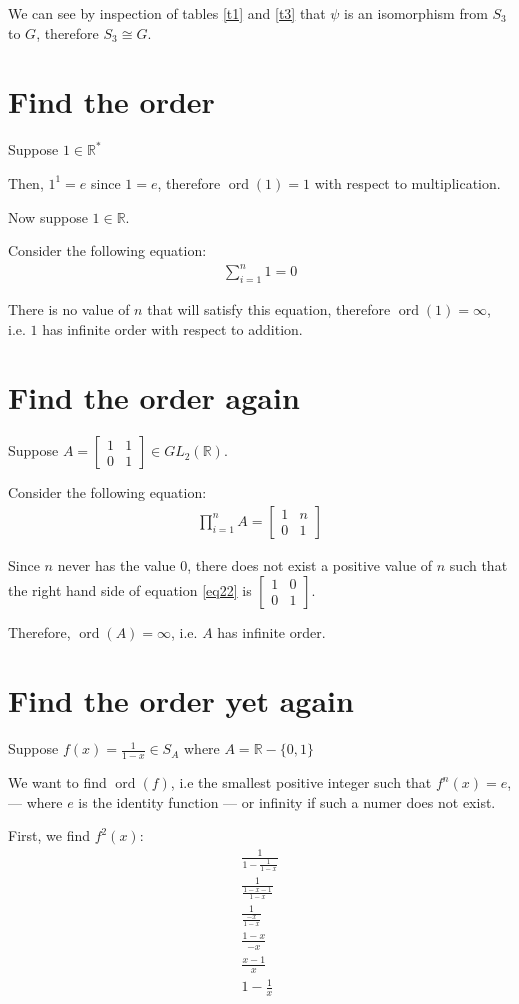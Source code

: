 \documentclass[12pt]{article}
\newcommand{\reals}{\mathbb{R}}
\newcommand{\gltwo}{GL_2(\reals)}
\newcommand{\glmatrix}[4]{\ensuremath{\begin{bmatrix} #1 & #2 \\ #3 & #4 \end{bmatrix}}}
\newcommand{\ord}{\operatorname{ord}}
\begin{document}
We can see by inspection of tables \ref{t1} and \ref{t3}
that $\psi$ is an isomorphism from $S_3$ to $G$,
therefore $S_3 \cong G$.

\section{Find the order}

Suppose $1 \in \reals^*$

Then, $1^1 = e$ since $1 = e$, therefore $\ord(1) = 1$ with respect to multiplication.

Now suppose $1 \in \reals$.

Consider the following equation:
\begin{align} \label{eq21}
	\sum_{i=1}^n 1 = 0
\end{align}

There is no value of $n$ that will satisfy this equation,
therefore $\ord(1) = \infty$, i.e. $1$ has infinite order
with respect to addition.



\section{Find the order again}

Suppose $A = \glmatrix{1}{1}{0}{1} \in \gltwo$.

Consider the following equation:
\begin{align} \label{eq22}
	\prod_{i=1}^n A = \glmatrix{1}{n}{0}{1}
\end{align}

Since $n$ never has the value $0$,
there does not exist a positive value of $n$ such that
the right hand side of equation \ref{eq22}
is $\glmatrix{1}{0}{0}{1}$.

Therefore, $\ord(A) = \infty$, i.e. $A$ has infinite order.

\section{Find the order yet again}

Suppose $f(x) = \frac{1}{1-x} \in S_A$ where $A = \reals - \{ 0, 1 \}$

We want to find $\ord(f)$, i.e the smallest positive integer such that $f^n(x) = e$,
--- where $e$ is the identity function ---
or infinity if such a numer does not exist.

First, we find $f^2(x)$:
\begin{align}
	\frac{1}{1-\frac{1}{1-x}} \\
	\frac{1}{\frac{1 - x - 1}{1 - x}} \\
	\frac{1}{\frac{ -x }{1 - x}} \\
	\frac{1 - x}{-x} \\
	\frac{x - 1}{x} \\
	1 - \frac{1}{x} 
\end{align}
\end{document}
